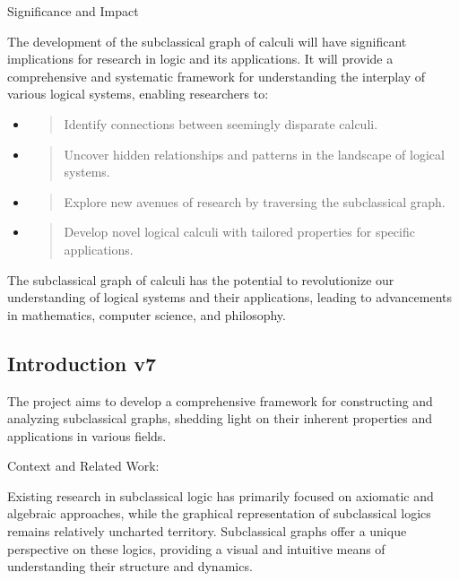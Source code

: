 Significance and Impact

The development of the subclassical graph of calculi will have
significant implications for research in logic and its applications. It
will provide a comprehensive and systematic framework for understanding
the interplay of various logical systems, enabling researchers to:

\begin{itemize}
\item
  \begin{quote}
  Identify connections between seemingly disparate calculi.
  \end{quote}
\item
  \begin{quote}
  Uncover hidden relationships and patterns in the landscape of logical
  systems.
  \end{quote}
\item
  \begin{quote}
  Explore new avenues of research by traversing the subclassical graph.
  \end{quote}
\item
  \begin{quote}
  Develop novel logical calculi with tailored properties for specific
  applications.
  \end{quote}
\end{itemize}

The subclassical graph of calculi has the potential to revolutionize our
understanding of logical systems and their applications, leading to
advancements in mathematics, computer science, and philosophy.

\hypertarget{introduction-v7}{%
\subsection{Introduction v7}\label{introduction-v7}}

The project aims to develop a comprehensive framework for constructing
and analyzing subclassical graphs, shedding light on their inherent
properties and applications in various fields.

Context and Related Work:

Existing research in subclassical logic has primarily focused on
axiomatic and algebraic approaches, while the graphical representation
of subclassical logics remains relatively uncharted territory.
Subclassical graphs offer a unique perspective on these logics,
providing a visual and intuitive means of understanding their structure
and dynamics.

